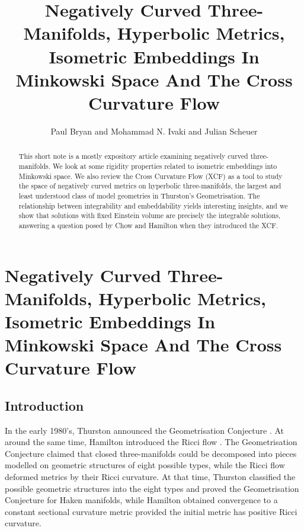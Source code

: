 \documentclass{cambridge7a}
\author{Paul Bryan and Mohammad N. Ivaki and Julian Scheuer}
\renewcommand{\~}{\tilde}
\renewcommand{\-}{\bar}
\newcommand{\8}{\infty}
\begin{document}
\title[Negatively Curved Three Manifolds]{Negatively Curved Three-Manifolds, Hyperbolic Metrics, Isometric Embeddings In Minkowski Space And The Cross Curvature Flow}




\begin{abstract}
This short note is a mostly expository article examining negatively curved three-manifolds. We look at some rigidity properties related to isometric embeddings into Minkowski space. We also review the Cross Curvature Flow (XCF) as a tool to study the space of negatively curved metrics on hyperbolic three-manifolds, the largest and least understood class of model geometries in Thurston's Geometrisation. The relationship between integrability and embeddability yields interesting insights, and we show that solutions with fixed Einstein volume are precisely the integrable solutions, answering a question posed by Chow and Hamilton when they introduced the XCF.
\end{abstract}

\maketitle

\chapter[Negatively Curved Three Manifolds]{Negatively Curved Three-Manifolds, Hyperbolic Metrics, Isometric Embeddings In Minkowski Space And The Cross Curvature Flow}

\section{Introduction}
\label{sec:intro}

In the early 1980's, Thurston announced the Geometrisation Conjecture \cite{MR648524}. At around the same time, Hamilton introduced the Ricci flow \cite{Hamilton:/1982}. The Geometrisation Conjecture claimed that closed three-manifolds could be decomposed into pieces modelled on geometric structures of eight possible types, while the Ricci flow deformed metrics by their Ricci curvature. At that time, Thurston classified the possible geometric structures into the eight types and proved the Geometrisation Conjecture for Haken manifolds, while Hamilton obtained convergence to a constant sectional curvature metric provided the initial metric has positive Ricci curvature.
\end{document}
